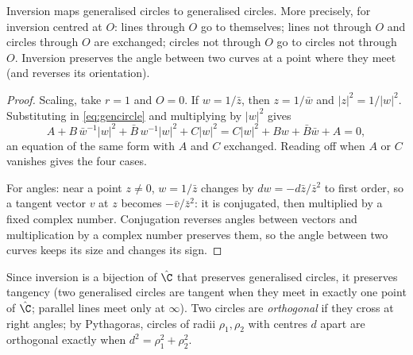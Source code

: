 \begin{theorem}\label{thm:invcircles}
Inversion maps generalised circles to generalised circles. More precisely, for inversion centred at $O$: lines through $O$ go to themselves;
lines not through $O$ and circles through $O$ are exchanged; circles not through $O$ go to circles not through $O$. Inversion preserves the
angle between two curves at a point where they meet (and reverses its orientation).
\end{theorem}
\begin{proof}
Scaling, take $r=1$ and $O=0$. If $w=1/\bar z$, then $z=1/\bar w$ and $|z|^2=1/|w|^2$. Substituting in \eqref{eq:gencircle} and multiplying by
$|w|^2$ gives
\[
A+B\,\bar w^{-1}|w|^2+\bar B\,w^{-1}|w|^2+C|w|^2=C|w|^2+Bw+\bar B\bar w+A=0,
\]
an equation of the same form with $A$ and $C$ exchanged. Reading off when $A$ or $C$ vanishes gives the four cases.

For angles: near a point $z\ne0$, $w=1/\bar z$ changes by $dw=-d\bar z/\bar z^2$ to first order, so a tangent vector $v$ at $z$ becomes
$-\bar v/\bar z^2$: it is conjugated, then multiplied by a fixed complex number. Conjugation reverses angles between vectors and
multiplication by a complex number preserves them, so the angle between two curves keeps its size and changes its sign.
\end{proof}

Since inversion is a bijection of $\hat{\C}$ that preserves generalised circles, it preserves tangency (two generalised circles are tangent
when they meet in exactly one point of $\hat{\C}$; parallel lines meet only at $\infty$). Two circles are \emph{orthogonal} if they cross at
right angles; by Pythagoras, circles of radii $\rho_1,\rho_2$ with centres $d$ apart are orthogonal exactly when $d^2=\rho_1^2+\rho_2^2$.

